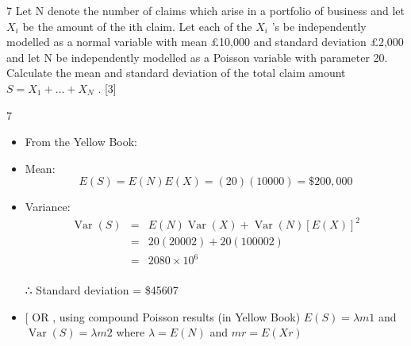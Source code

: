 \documentclass[a4paper,12pt]{article}
\begin{document}
7
Let N denote the number of claims which arise in a portfolio of business and let $X_{i}$ be
the amount of the ith claim. Let each of the $X_{i}$ ’s be independently modelled as a
normal variable with mean £10,000 and standard deviation £2,000 and let N be
independently modelled as a Poisson variable with parameter 20.
Calculate the mean and standard deviation of the total claim amount $S = X_1 + \ldots +X_N$ .
[3]

\newpage

7
\begin{itemize}
\item From the Yellow Book:
\item Mean:
\[E(S) = E(N)E(X) = (20)(10000) = \$200,000\]
\item Variance: 
\begin{eqnarray*}\operatorname{Var}(S) &=& E(N) \operatorname{Var}(X) + \operatorname{Var}(N)[E(X)]^2\\
&=& 20(2000 2 ) + 20(10000 2 ) \\ &=& 2080 × 10^6\\
\end{eqnarray*}

∴ Standard deviation = \$45607
\item [ OR , using compound Poisson results (in Yellow Book)
$E(S) = \lambda m 1$ and $\operatorname{Var}(S) = \lambda m 2$ where $\lambda = E(N)$ and $m r = E(X r )$
\end{itemize}
\end{document}
